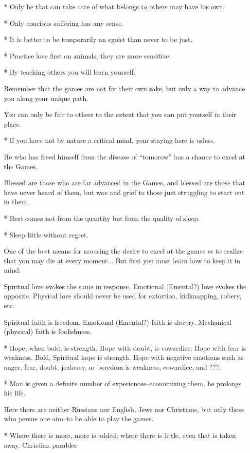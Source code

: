 \documentclass[12pt,letterpaper]{book}
\begin{document}
* Only he that can take care of what belongs to others may have his own.

* Only concious suffering has any sense.

* It is better to be temporarily an egoist than never to be just.

* Practice love first on animals, they are more sensitive.

* By teaching others you will learn yourself.

Remember that the games are not for their own sake, but only a way to advance you along your unique path.

You can only be fair to others to the extent that you can put yourself in their place.

* If you have not by nature a critical mind, your staying here is usless.

He who has freed himself from the disease of ``tomorow'' has a chance to excel at the Games.

Blessed are those who are far advanced in the Games, and blessed are those that have never heard of them, but woe and grief to those just struggling to start out in them.

* Rest comes not from the quantity but from the quality of sleep.

* Sleep little without regret.

One of the best means for arousing the desire to excel at the games es to realize that you may die at every moment... But first you must learn how to keep it in mind.

Spiritual love evokes the same in response, Emotional (Emental?) love evokes the opposite. Physical love should never be used for extortion, kidknapping, robery, etc.

Spiritual faith is freedom. Emotional (Emental?) faith is slavery. Mechanical (physical) faith is foolishness.

* Hope, when bold, is strength. Hope with doubt, is cowardice. Hope with fear is weakness. 
Bold, Spiritual hope is strength. Hope with negative emotions such as anger, fear, doubt, jealousy, or boredom is weakness, cowardice, and ???.

* Man is given a definite number of experiences--economizing them, he prolongs his life.

Here there are neither Russians nor English, Jews nor Christians, but only those who persue one aim--to be able to play the games.

* Where there is more, more is added; where there is little, even that is taken away.
Christian parables
\end{document}
